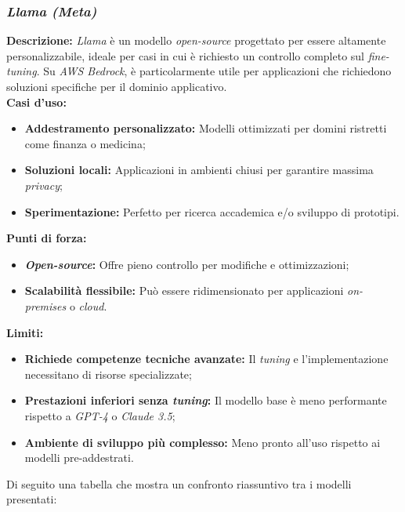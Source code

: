 \subsubsection{\textit{Llama (Meta)}}

\noindent \textbf{Descrizione:}
\textit{Llama} è un modello \textit{open-source} progettato per essere altamente personalizzabile, ideale per casi in cui è richiesto un controllo completo sul \textit{fine-tuning}. 
Su \textit{AWS Bedrock}, è particolarmente utile per applicazioni che richiedono soluzioni specifiche per il dominio applicativo.\\

\noindent \textbf{Casi d’uso:}
\begin{itemize}
    \item \textbf{Addestramento personalizzato:} Modelli ottimizzati per domini ristretti come finanza o medicina;
    \item \textbf{Soluzioni locali:} Applicazioni in ambienti chiusi per garantire massima \textit{privacy};
    \item \textbf{Sperimentazione:} Perfetto per ricerca accademica e/o sviluppo di prototipi.
\end{itemize}

\noindent \textbf{Punti di forza:}
\begin{itemize}
    \item \textbf{\textit{Open-source}:} Offre pieno controllo per modifiche e ottimizzazioni;
    \item \textbf{Scalabilità flessibile:} Può essere ridimensionato per applicazioni \textit{on-premises} o \textit{cloud}.
\end{itemize}

\noindent \textbf{Limiti:}
\begin{itemize}
    \item \textbf{Richiede competenze tecniche avanzate:} Il \textit{tuning} e l’implementazione necessitano di risorse specializzate;
    \item \textbf{Prestazioni inferiori senza \textit{tuning}:} Il modello base è meno performante rispetto a \textit{GPT-4} o \textit{Claude 3.5};
    \item \textbf{Ambiente di sviluppo più complesso:} Meno pronto all’uso rispetto ai modelli pre-addestrati.
\end{itemize}

\vspace{2cm}
\noindent Di seguito una tabella che mostra un confronto riassuntivo tra i modelli presentati:

